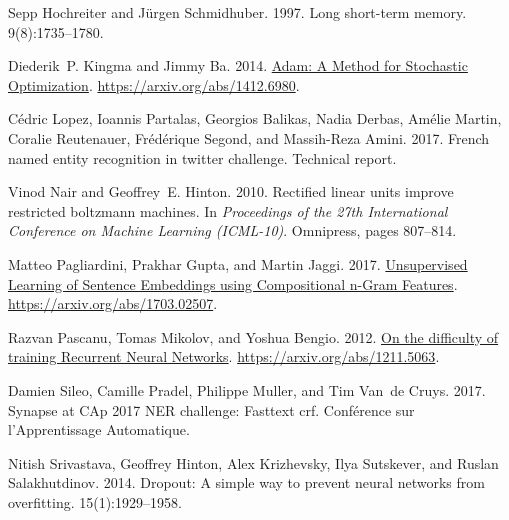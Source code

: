 \documentclass[11pt,letterpaper]{article}
\begin{document}
\begin{thebibliography}{}
Sepp Hochreiter and J\"{u}rgen Schmidhuber. 1997.
\newblock Long short-term memory.
 9(8):1735--1780.

Diederik~P. Kingma and Jimmy Ba. 2014.
\newblock \href{https://arxiv.org/abs/1412.6980}{{Adam: A Method for Stochastic
  Optimization}}.
  \href{https://arxiv.org/abs/1412.6980}{https://arxiv.org/abs/1412.6980}.

Cédric Lopez, Ioannis Partalas, Georgios Balikas, Nadia Derbas, Amélie
  Martin, Coralie Reutenauer, Frédérique Segond, and Massih-Reza Amini. 2017.
\newblock French named entity recognition in twitter challenge.
\newblock Technical report.

Vinod Nair and Geoffrey~E. Hinton. 2010.
\newblock Rectified linear units improve restricted boltzmann machines.
\newblock In {\em Proceedings of the 27th International Conference on Machine
  Learning (ICML-10)\/}. Omnipress, pages 807--814.

Matteo Pagliardini, Prakhar Gupta, and Martin Jaggi. 2017.
\newblock \href{https://arxiv.org/abs/1703.02507}{{Unsupervised Learning of
  Sentence Embeddings using Compositional n-Gram Features}}.
  \href{https://arxiv.org/abs/1703.02507}{https://arxiv.org/abs/1703.02507}.

Razvan {Pascanu}, Tomas {Mikolov}, and Yoshua {Bengio}. 2012.
\newblock \href{https://arxiv.org/abs/1211.5063}{{On the difficulty of training
  Recurrent Neural Networks}}.
  \href{https://arxiv.org/abs/1211.5063}{https://arxiv.org/abs/1211.5063}.

Damien Sileo, Camille Pradel, Philippe Muller, and Tim Van~de Cruys. 2017.
\newblock Synapse at {CAp 2017} {NER} challenge: Fasttext crf.
\newblock Conf\'{e}rence sur l'Apprentissage Automatique.

Nitish Srivastava, Geoffrey Hinton, Alex Krizhevsky, Ilya Sutskever, and Ruslan
  Salakhutdinov. 2014.
\newblock Dropout: A simple way to prevent neural networks from overfitting.
 15(1):1929--1958.


\end{thebibliography}
\end{document}
